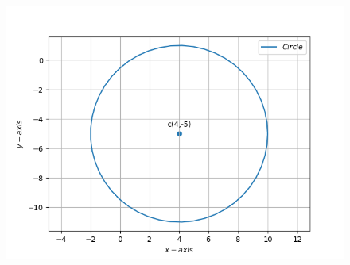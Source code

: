 \documentclass[12pt]{article}
\begin{document}
\begin{enumerate}
\begin{figure}[!h]
\begin{center}
	   \includegraphics[width=\columnwidth]{figs/Figure_1.png}
	\end{center}
\caption{}
\label{fig:Fig1}
\end{figure}

\end{enumerate}
\end{document}
